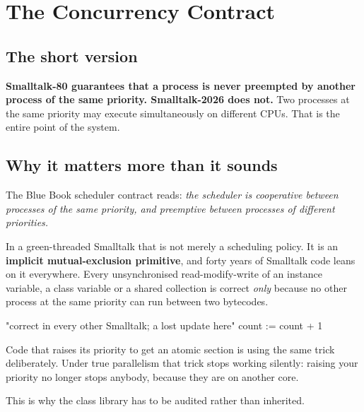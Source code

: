 \chapter{The Concurrency Contract}
\label{ch:contract}


\section{The short version}

\begin{stwarn}
\textbf{Smalltalk-80 guarantees that a process is never preempted by another
process of the same priority. Smalltalk-2026 does not.} Two processes at the
same priority may execute simultaneously on different CPUs. That is the entire
point of the system.
\end{stwarn}

\section{Why it matters more than it sounds}

The Blue Book scheduler contract reads: \emph{the scheduler is cooperative
between processes of the same priority, and preemptive between processes of
different priorities.}

In a green-threaded Smalltalk that is not merely a scheduling policy. It is an
\textbf{implicit mutual-exclusion primitive}, and forty years of Smalltalk code
leans on it everywhere. Every unsynchronised read-modify-write of an instance
variable, a class variable or a shared collection is correct \emph{only}
because no other process at the same priority can run between two bytecodes.

\begin{st}
"correct in every other Smalltalk; a lost update here"
count := count + 1
\end{st}

Code that raises its priority to get an atomic section is using the same trick
deliberately. Under true parallelism that trick stops working silently:
raising your priority no longer stops anybody, because they are on another
core.

This is why the class library has to be audited rather than inherited.

